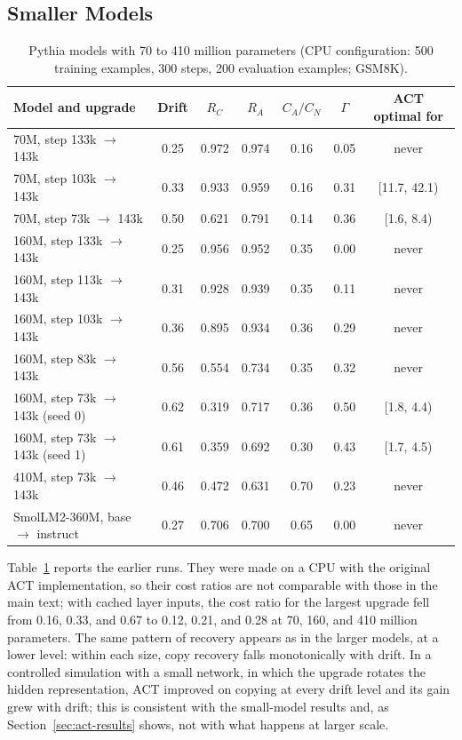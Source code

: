 \documentclass[ijds,nonblindrev]{informs4}
\begin{document}
\begin{APPENDICES}
\section{Smaller Models}\label{app:small}

\begin{table}[t]
\centering
\caption{Pythia models with 70 to 410 million parameters (CPU configuration: 500 training examples, 300 steps, 200 evaluation examples; GSM8K).}\label{tab:small}
\small
\begin{tabular}{lcccccc}
\toprule
Model and upgrade & Drift & $R_C$ & $R_A$ & $C_A/C_N$ & $\Gamma$ & ACT optimal for\\
\midrule
70M, step 133k $\to$ 143k & 0.25 & 0.972 & 0.974 & 0.16 & 0.05 & never\\
70M, step 103k $\to$ 143k & 0.33 & 0.933 & 0.959 & 0.16 & 0.31 & [11.7, 42.1)\\
70M, step 73k $\to$ 143k & 0.50 & 0.621 & 0.791 & 0.14 & 0.36 & [1.6, 8.4)\\
160M, step 133k $\to$ 143k & 0.25 & 0.956 & 0.952 & 0.35 & 0.00 & never\\
160M, step 113k $\to$ 143k & 0.31 & 0.928 & 0.939 & 0.35 & 0.11 & never\\
160M, step 103k $\to$ 143k & 0.36 & 0.895 & 0.934 & 0.36 & 0.29 & never\\
160M, step 83k $\to$ 143k & 0.56 & 0.554 & 0.734 & 0.35 & 0.32 & never\\
160M, step 73k $\to$ 143k (seed 0) & 0.62 & 0.319 & 0.717 & 0.36 & 0.50 & [1.8, 4.4)\\
160M, step 73k $\to$ 143k (seed 1) & 0.61 & 0.359 & 0.692 & 0.30 & 0.43 & [1.7, 4.5)\\
410M, step 73k $\to$ 143k & 0.46 & 0.472 & 0.631 & 0.70 & 0.23 & never\\
SmolLM2-360M, base $\to$ instruct & 0.27 & 0.706 & 0.700 & 0.65 & 0.00 & never\\
\bottomrule
\end{tabular}
\end{table}

Table~\ref{tab:small} reports the earlier runs. They were made on a CPU with the original ACT implementation, so their cost ratios are not comparable with those in the main text; with cached layer inputs, the cost ratio for the largest upgrade fell from 0.16, 0.33, and 0.67 to 0.12, 0.21, and 0.28 at 70, 160, and 410 million parameters. The same pattern of recovery appears as in the larger models, at a lower level: within each size, copy recovery falls monotonically with drift. In a controlled simulation with a small network, in which the upgrade rotates the hidden representation, ACT improved on copying at every drift level and its gain grew with drift; this is consistent with the small-model results and, as Section~\ref{sec:act-results} shows, not with what happens at larger scale.

\end{APPENDICES}
\end{document}
